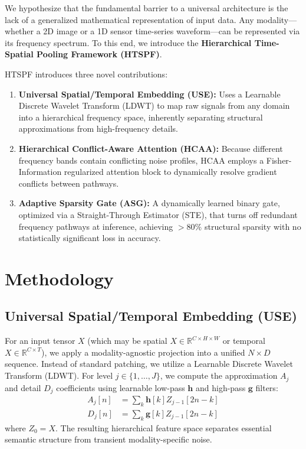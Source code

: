 \documentclass[journal]{IEEEtran}
\begin{document}
We hypothesize that the fundamental barrier to a universal architecture is the lack of a generalized mathematical representation of input data. Any modality—whether a 2D image or a 1D sensor time-series waveform—can be represented via its frequency spectrum. To this end, we introduce the \textbf{Hierarchical Time-Spatial Pooling Framework (HTSPF)}.

HTSPF introduces three novel contributions:
\begin{enumerate}
    \item \textbf{Universal Spatial/Temporal Embedding (USE):} Uses a Learnable Discrete Wavelet Transform (LDWT) to map raw signals from any domain into a hierarchical frequency space, inherently separating structural approximations from high-frequency details.
    \item \textbf{Hierarchical Conflict-Aware Attention (HCAA):} Because different frequency bands contain conflicting noise profiles, HCAA employs a Fisher-Information regularized attention block to dynamically resolve gradient conflicts between pathways.
    \item \textbf{Adaptive Sparsity Gate (ASG):} A dynamically learned binary gate, optimized via a Straight-Through Estimator (STE), that turns off redundant frequency pathways at inference, achieving $>80\%$ structural sparsity with no statistically significant loss in accuracy.
\end{enumerate}

\section{Methodology}

\subsection{Universal Spatial/Temporal Embedding (USE)}
For an input tensor $X$ (which may be spatial $X \in \mathbb{R}^{C \times H \times W}$ or temporal $X \in \mathbb{R}^{C \times T}$), we apply a modality-agnostic projection into a unified $N \times D$ sequence. Instead of standard patching, we utilize a Learnable Discrete Wavelet Transform (LDWT). For level $j \in \{1, \dots, J\}$, we compute the approximation $A_j$ and detail $D_j$ coefficients using learnable low-pass $\mathbf{h}$ and high-pass $\mathbf{g}$ filters:
\begin{align}
    A_j[n] &= \sum_{k} \mathbf{h}[k] Z_{j-1}[2n - k] \\
    D_j[n] &= \sum_{k} \mathbf{g}[k] Z_{j-1}[2n - k]
\end{align}
where $Z_0 = X$. The resulting hierarchical feature space separates essential semantic structure from transient modality-specific noise.
\end{document}
